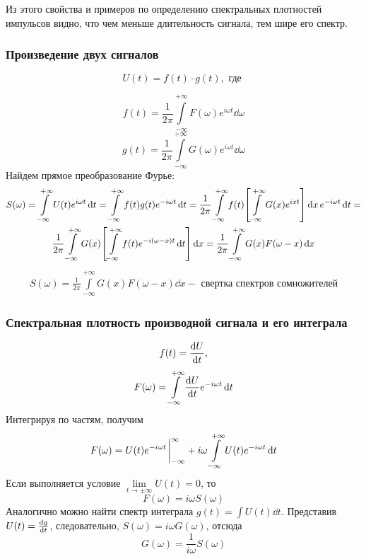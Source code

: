\documentclass[a4paper,14pt]{extarticle}
\gdef\newint{\int\limits_{-\infty}^{+\infty}}
\theoremstyle{definition}
\begin{document}
Из этого свойства и примеров по определению спектральных плотностей
импульсов видно, что чем меньше длительность сигнала, тем шире его спектр.

\subsubsection{Произведение двух сигналов}

\begin{equation}
	U(t)=f(t)\cdot g(t), \text{ где }
\end{equation}

\begin{equation}
	f(t)=\frac{1}{2\pi}\newint F(\omega) e^{i \omega t} \dd{\omega}
\end{equation}
\begin{equation}
	g(t)=\frac{1}{2\pi}\newint G(\omega) e^{i \omega t} \dd{\omega}
\end{equation}
Найдем прямое преобразование Фурье:
\begin{gather*}
	S(\omega)=\newint U(t)e^{i \omega t} \dd{t} = \newint f(t) g(t) 
		e^{-i \omega t} \dd{t} =
	\frac{1}{2\pi} \newint f(t) \qty[\newint G(x)e^{i x t} ] \dd{x} 
		e^{-i \omega t} \dd{t}=\\ 
	\frac{1}{2\pi} \newint G(x) 
		\qty[\newint f(t)e^{-i (\omega-x)t} \dd{t} ] \dd{x}=
	\frac{1}{2\pi}\newint G(x)F(\omega-x)\dd{x}
\end{gather*}
\begin{gather*}
\boxed{
	S(\omega)=\frac{1}{2\pi} \newint G(x)F(\omega-x)\dd{x}
	}-\text{ свертка спектров сомножителей}
\end{gather*}
\subsubsection{Спектральная плотность производной сигнала и его интеграла}

$$f(t)=\dv{U}{t},$$
$$F(\omega) = \newint \dv{U}{t} e^{-i \omega t} \dd{t} $$
Интегрируя по частям, получим
\begin{equation}
	F(\omega)=U(t)e^{-i \omega t} \eval_{-\infty}^{\infty}+i \omega \newint U(t)e^{-i \omega t} \dd{t}
\end{equation}
Если выполняется условие $\displaystyle\lim\limits_{t\rightarrow\pm\infty} U(t)=0$, то
\begin{equation}
	\boxed{
	F(\omega)=i \omega S(\omega)
	}
\end{equation}
Аналогично можно найти спектр интеграла $g(t)=\int U(t) \dd{t}$.
Представив $U(t)=\dv{g}{t}$, следовательно, $S(\omega)=i \omega G(\omega)$, отсюда
\begin{equation}
	\boxed{
	G(\omega)=\frac{1}{i \omega} S(\omega)
	}
\end{equation}
\end{document}
